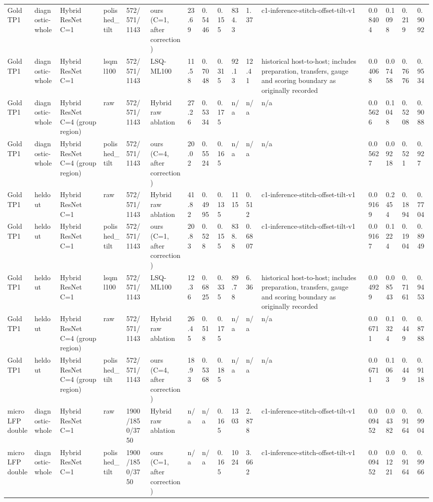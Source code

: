 \begin{tabular}{llllllllllllllll}
Gold TP1 & diagnostic-whole & Hybrid ResNet C=1 & polished\_tilt & 572/571/1143 & ours (C=1, after correction) & 23.69 & 0.5446 & 0.155 & 834.3 & 1.37 & c1-inference-stitch-offset-tilt-v1 & 0.08404 & 0.1098 & 0.219 & 0.9092 \\
Gold TP1 & diagnostic-whole & Hybrid ResNet C=1 & lsqml100 & 572/571/1143 & LSQ-ML100 & 11.58 & 0.7048 & 0.315 & 92.13 & 12.41 & historical host-to-host; includes preparation, transfers, gauge and scoring boundary as originally recorded & 0.04068 & 0.07458 & 0.7676 & 0.9534 \\
Gold TP1 & diagnostic-whole & Hybrid ResNet C=4 (group region) & raw & 572/571/1143 & Hybrid raw ablation & 27.26 & 0.5334 & 0.175 & n/a & n/a & n/a & 0.05626 & 0.1048 & 0.5208 & 0.9088 \\
Gold TP1 & diagnostic-whole & Hybrid ResNet C=4 (group region) & polished\_tilt & 572/571/1143 & ours (C=4, after correction) & 20.02 & 0.5524 & 0.165 & n/a & n/a & n/a & 0.05627 & 0.09218 & 0.521 & 0.927 \\
Gold TP1 & heldout & Hybrid ResNet C=1 & raw & 572/571/1143 & Hybrid raw ablation & 41.82 & 0.4995 & 0.135 & 1115 & 0.512 & c1-inference-stitch-offset-tilt-v1 & 0.09169 & 0.2454 & 0.1894 & 0.7704 \\
Gold TP1 & heldout & Hybrid ResNet C=1 & polished\_tilt & 572/571/1143 & ours (C=1, after correction) & 20.83 & 0.528 & 0.155 & 838.8 & 0.6807 & c1-inference-stitch-offset-tilt-v1 & 0.09167 & 0.1224 & 0.1904 & 0.8949 \\
Gold TP1 & heldout & Hybrid ResNet C=1 & lsqml100 & 572/571/1143 & LSQ-ML100 & 12.36 & 0.6825 & 0.335 & 89.78 & 6.36 & historical host-to-host; includes preparation, transfers, gauge and scoring boundary as originally recorded & 0.04929 & 0.08543 & 0.7161 & 0.9453 \\
Gold TP1 & heldout & Hybrid ResNet C=4 (group region) & raw & 572/571/1143 & Hybrid raw ablation & 26.45 & 0.518 & 0.175 & n/a & n/a & n/a & 0.06711 & 0.1324 & 0.449 & 0.8788 \\
Gold TP1 & heldout & Hybrid ResNet C=4 (group region) & polished\_tilt & 572/571/1143 & ours (C=4, after correction) & 18.93 & 0.5368 & 0.185 & n/a & n/a & n/a & 0.06711 & 0.1063 & 0.449 & 0.9118 \\
microLFP double & diagnostic-whole & Hybrid ResNet C=1 & raw & 1900/1850/3750 & Hybrid raw ablation & n/a & n/a & 0.165 & 1303 & 2.878 & c1-inference-stitch-offset-tilt-v1 & 0.009452 & 0.04382 & 0.9164 & 0.9904 \\
microLFP double & diagnostic-whole & Hybrid ResNet C=1 & polished\_tilt & 1900/1850/3750 & ours (C=1, after correction) & n/a & n/a & 0.165 & 1024 & 3.662 & c1-inference-stitch-offset-tilt-v1 & 0.009452 & 0.01221 & 0.9164 & 0.9966 \\

\end{tabular}
